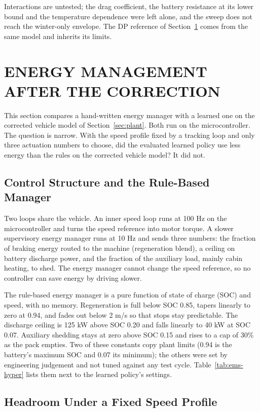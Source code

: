 \documentclass{ieeeaccess}
\begin{document}
Interactions are untested; the drag coefficient, the battery resistance at its lower bound and the temperature dependence were left alone, and the sweep does not reach the winter-only envelope. The DP reference of Section~\ref{sec:ems} comes from the same model and inherits its limits.

\section{ENERGY MANAGEMENT AFTER THE CORRECTION}
\label{sec:ems}

This section compares a hand-written energy manager with a learned one on the corrected vehicle model of Section~\ref{sec:plant}. Both run on the microcontroller. The question is narrow. With the speed profile fixed by a tracking loop and only three actuation numbers to choose, did the evaluated learned policy use less energy than the rules on the corrected vehicle model? It did not.

\subsection{Control Structure and the Rule-Based Manager}

Two loops share the vehicle. An inner speed loop runs at 100 Hz on the microcontroller and turns the speed reference into motor torque. A slower supervisory energy manager runs at 10 Hz and sends three numbers: the fraction of braking energy routed to the machine (regeneration blend), a ceiling on battery discharge power, and the fraction of the auxiliary load, mainly cabin heating, to shed. The energy manager cannot change the speed reference, so no controller can save energy by driving slower.

The rule-based energy manager is a pure function of state of charge (SOC) and speed, with no memory. Regeneration is full below SOC 0.85, tapers linearly to zero at 0.94, and fades out below 2 m/s so that stops stay predictable. The discharge ceiling is 125 kW above SOC 0.20 and falls linearly to 40 kW at SOC 0.07. Auxiliary shedding stays at zero above SOC 0.15 and rises to a cap of 30\% as the pack empties. Two of these constants copy plant limits (0.94 is the battery's maximum SOC and 0.07 its minimum); the others were set by engineering judgement and not tuned against any test cycle. Table~\ref{tab:ems-hyper} lists them next to the learned policy's settings.

\subsection{Headroom Under a Fixed Speed Profile}
\end{document}
